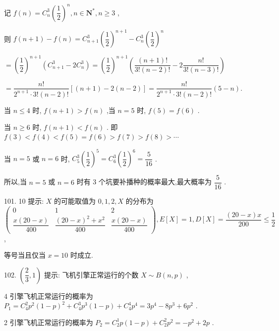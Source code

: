 记 $f\left( n\right)  = {C}_{n}^{3}{\left( \dfrac{1}{2}\right) }^{n},n \in  {\mathbf{N}}^{ * },n \geq  3$ ,

则 $f\left( {n + 1}\right)  - f\left( n\right)  = {C}_{n + 1}^{3}{\left( \dfrac{1}{2}\right) }^{n + 1} - {C}_{n}^{3}{\left( \dfrac{1}{2}\right) }^{n}$

$= {\left( \dfrac{1}{2}\right) }^{n + 1}\left( {{C}_{n + 1}^{3} - 2{C}_{n}^{3}}\right)  = {\left( \dfrac{1}{2}\right) }^{n + 1}\left( {\dfrac{\left( {n + 1}\right) !}{3!\left( {n - 2}\right) !} - 2\dfrac{n!}{3!\left( {n - 3}\right) !}}\right)$

$= \dfrac{n!}{{2}^{n + 1} \cdot  3!\left( {n - 2}\right) !}\left\lbrack  {\left( {n + 1}\right)  - 2\left( {n - 2}\right) }\right\rbrack   = \dfrac{n!}{{2}^{n + 1} \cdot  3!\left( {n - 2}\right) !}\left( {5 - n}\right) .$

当 $n \leq  4$ 时, $f\left( {n + 1}\right)  > f\left( n\right)$ ,当 $n = 5$ 时, $f\left( 5\right)  = f\left( 6\right)$ .

当 $n \geq  6$ 时, $f\left( {n + 1}\right)  < f\left( n\right)$ . 即 $f\left( 3\right)  < f\left( 4\right)  < f\left( 5\right)  = f\left( 6\right)  > f\left( 7\right)  > f\left( 8\right)  > \cdots$

当 $n = 5$ 或 $n = 6$ 时, ${C}_{5}^{3}{\left( \dfrac{1}{2}\right) }^{5} = {C}_{6}^{3}{\left( \dfrac{1}{2}\right) }^{6} = \dfrac{5}{16}$ .

所以,当 $n = 5$ 或 $n = 6$ 时有 3 个坑要补播种的概率最大,最大概率为 $\dfrac{5}{16}$ .

101. 10 提示: $X$ 的可能取值为 $0,1,2,X$ 的分布为 $\left( \begin{matrix} 0 & 1 & 2 \\  \dfrac{x\left( {{20} - x}\right) }{400} & \dfrac{{\left( {20} - x\right) }^{2} + {x}^{2}}{400} & \dfrac{x\left( {{20} - x}\right) }{400} \end{matrix}\right) ,E\left\lbrack  X\right\rbrack   = 1,D\left\lbrack  X\right\rbrack   = \dfrac{\left( {{20} - x}\right) x}{200} \leq  \dfrac{1}{2}$ ,

等号当且仅当 $x = {10}$ 时成立.

102. $\left( {\dfrac{2}{3},1}\right)$ 提示: 飞机引擎正常运行的个数 $X \sim  B\left( {n,p}\right)$ ,

4 引擎飞机正常运行的概率为 ${P}_{1} = {C}_{4}^{2}{p}^{2}{\left( 1 - p\right) }^{2} + {C}_{4}^{3}{p}^{3}\left( {1 - p}\right)  + {C}_{4}^{4}{p}^{4} = 3{p}^{4} - 8{p}^{3} + 6{p}^{2}$ .

2 引擎飞机正常运行的概率为 ${P}_{2} = {C}_{2}^{1}p\left( {1 - p}\right)  + {C}_{2}^{2}{p}^{2} =  - {p}^{2} + {2p}$ .

